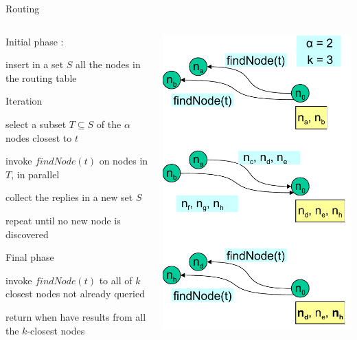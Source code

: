 \begin{frame}{Routing}

\begin{columns}
\begin{column}{0.65\textwidth}
\BI
\item \alert{Initial phase} :
	\BI
	\item insert in a set $S$ all the nodes in the routing table
	\EI
\item \alert{Iteration}
	\BI
	\item select a subset $T \subseteq S$ of the $\alpha$ nodes closest to $t$
	\item invoke $\mathit{findNode}(t)$ on nodes in $T$, \alert{in parallel}
	\item collect the replies in a new set $S$
	\item repeat until no new node is discovered 
	\EI
\item \alert{Final phase}
	\BI
	\item invoke $\mathit{findNode}(t)$ to all of $k$ closest nodes not already queried
	\item return when have results from all the $k$-closest nodes
	\EI
\EI
\end{column}
\begin{column}{0.35\textwidth}
\includegraphics[width=\textwidth]{figs/10/kad-routing}

\end{column}
\end{columns}
\end{frame}
